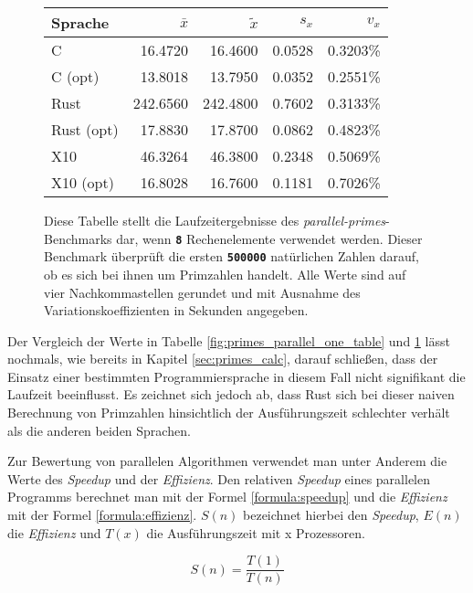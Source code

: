 \begin{figure}[hb]
	\begin{center}
		\begin{tabular}{lrrrr}
			\toprule
			Sprache & $\bar{x}$ & $\tilde{x}$ & $s_x$ & $v_x$ \\
			\midrule
			C          &  16.4720 &  16.4600 & 0.0528 & 0.3203\% \\
			C (opt)    &  13.8018 &  13.7950 & 0.0352 & 0.2551\% \\
			Rust       & 242.6560 & 242.4800 & 0.7602 & 0.3133\% \\
			Rust (opt) &  17.8830 &  17.8700 & 0.0862 & 0.4823\% \\
			X10        &  46.3264 &  46.3800 & 0.2348 & 0.5069\% \\
			X10 (opt)  &  16.8028 &  16.7600 & 0.1181 & 0.7026\% \\
			\bottomrule
		\end{tabular}
	\end{center}
	\caption{
		Diese Tabelle stellt die Laufzeitergebnisse des \textit{parallel-primes}-Benchmarks dar,
		wenn \texttt{\textsc{\textbf{8}}} Rechenelemente verwendet werden.
		Dieser Benchmark überprüft die ersten \texttt{\textsc{\textbf{500000}}} natürlichen Zahlen darauf,
		ob es sich bei ihnen um Primzahlen handelt.
		Alle Werte sind auf vier Nachkommastellen gerundet und mit Ausnahme des Variationskoeffizienten
		in Sekunden angegeben.
	}
	\label{fig:primes_parallel_eight_table}
\end{figure}

Der Vergleich der Werte in Tabelle \ref{fig:primes_parallel_one_table} und \ref{fig:primes_parallel_eight_table} 
lässt nochmals, wie bereits in Kapitel \ref{sec:primes_calc}, darauf schließen, dass der Einsatz einer bestimmten
Programmiersprache in diesem Fall nicht signifikant die Laufzeit beeinflusst. Es zeichnet sich jedoch ab, dass
Rust sich bei dieser naiven Berechnung von Primzahlen hinsichtlich der Ausführungszeit schlechter verhält als
die anderen beiden Sprachen.

Zur Bewertung von parallelen Algorithmen verwendet man unter Anderem die Werte des \textit{Speedup}
und der \textit{Effizienz}.
Den relativen \textit{Speedup} eines parallelen Programms berechnet man mit der Formel \ref{formula:speedup} und die
\textit{Effizienz} mit der Formel \ref{formula:effizienz}. $S(n)$ bezeichnet hierbei den \textit{Speedup},
$E(n)$ die \textit{Effizienz} und $T(x)$ die Ausführungszeit mit x Prozessoren.

\begin{equation}
	\label{formula:speedup}
	S(n) = \frac{T(1)}{T(n)}
\end{equation}


